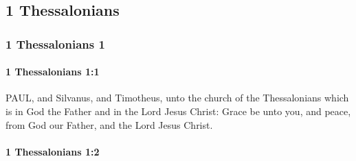 \subsection{1 Thessalonians}
	\label{1THESSALONIANS}
	
	\subsubsection{1 Thessalonians 1} %
		\label{1THESSALONIANS-1}
		
		\paragraph{1 Thessalonians 1:1} %
			\label{1THESSALONIANS-1-1}

			PAUL, and Silvanus, and Timotheus, unto the church of the Thessalonians which is in God the Father and in the Lord Jesus Christ: Grace be unto you, and peace, from God our Father, and the Lord Jesus Christ.

			\begin{framed}
			\scriptsize
				\begin{compactdesc}
					\item[SBLG] 
				\end{compactdesc}
			\end{framed}

		\paragraph{1 Thessalonians 1:2} %
			\label{1THESSALONIANS-1-2}

